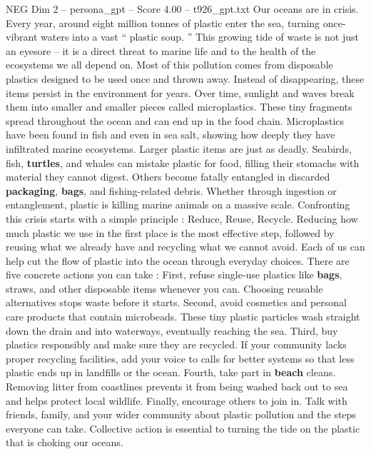 \begin{textsample}{NEG Dim 2 – persona\_gpt – Score 4.00 – t926\_gpt.txt}  \label{ex:f2_neg_047}
Our oceans are in crisis.
Every year, around eight million tonnes of plastic enter the sea, turning once-vibrant waters into a vast “ plastic soup. ” This growing tide of waste is not just an eyesore – it is a direct threat to marine life and to the health of the ecosystems we all depend on.
Most of this pollution comes from disposable plastics designed to be used once and thrown away.
Instead of disappearing, these items persist in the environment for years.
Over time, sunlight and waves break them into smaller and smaller pieces called microplastics.
These tiny fragments spread throughout the ocean and can end up in the food chain.
Microplastics have been found in fish and even in sea salt, showing how deeply they have infiltrated marine ecosystems.
Larger plastic items are just as deadly.
Seabirds, fish, \textbf{turtles}, and whales can mistake plastic for food, filling their stomachs with material they cannot digest.
Others become fatally entangled in discarded \textbf{packaging}, \textbf{bags}, and fishing-related debris.
Whether through ingestion or entanglement, plastic is killing marine animals on a massive scale.
Confronting this crisis starts with a simple principle : Reduce, Reuse, Recycle.
Reducing how much plastic we use in the first place is the most effective step, followed by reusing what we already have and recycling what we cannot avoid.
Each of us can help cut the flow of plastic into the ocean through everyday choices.
There are five concrete actions you can take : First, refuse single-use plastics like \textbf{bags}, straws, and other disposable items whenever you can.
Choosing reusable alternatives stops waste before it starts.
Second, avoid cosmetics and personal care products that contain microbeads.
These tiny plastic particles wash straight down the drain and into waterways, eventually reaching the sea.
Third, buy plastics responsibly and make sure they are recycled.
If your community lacks proper recycling facilities, add your voice to calls for better systems so that less plastic ends up in landfills or the ocean.
Fourth, take part in \textbf{beach} cleans.
Removing litter from coastlines prevents it from being washed back out to sea and helps protect local wildlife.
Finally, encourage others to join in.
Talk with friends, family, and your wider community about plastic pollution and the steps everyone can take.
Collective action is essential to turning the tide on the plastic that is choking our oceans.

\end{textsample}
